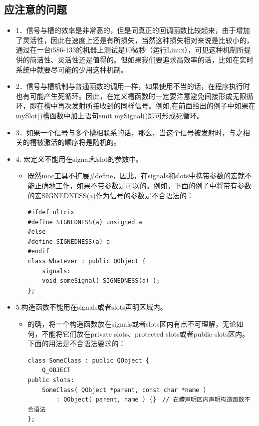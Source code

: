 \documentclass[9pt,b5paper]{article}
\begin{document}
\subsection{应注意的问题}
\label{sec-1-7}
\begin{itemize}
\item 1．信号与槽的效率是非常高的，但是同真正的回调函数比较起来，由于增加了灵活性，因此在速度上还是有所损失，当然这种损失相对来说是比较小的，通过在一台i586-133的机器上测试是10微秒（运行Linux），可见这种机制所提供的简洁性、灵活性还是值得的。但如果我们要追求高效率的话，比如在实时系统中就要尽可能的少用这种机制。
\item 2．信号与槽机制与普通函数的调用一样，如果使用不当的话，在程序执行时也有可能产生死循环。因此，在定义槽函数时一定要注意避免间接形成无限循环，即在槽中再次发射所接收到的同样信号。例如,在前面给出的例子中如果在mySlot()槽函数中加上语句emit mySignal()即可形成死循环。
\item 3．如果一个信号与多个槽相联系的话，那么，当这个信号被发射时，与之相关的槽被激活的顺序将是随机的。
\item 4. 宏定义不能用在signal和slot的参数中。
\begin{itemize}
\item 既然moc工具不扩展\#define，因此，在signals和slots中携带参数的宏就不能正确地工作，如果不带参数是可以的。例如，下面的例子中将带有参数的宏SIGNEDNESS(a)作为信号的参数是不合语法的：
\lstset{language=java,label= ,caption= ,numbers=none}
\begin{lstlisting}
#ifdef ultrix  
#define SIGNEDNESS(a) unsigned a  
#else  
#define SIGNEDNESS(a) a  
#endif  
class Whatever : public QObject {  
    signals:  
    void someSignal( SIGNEDNESS(a) );  
};
\end{lstlisting}
\end{itemize}
\item 5.构造函数不能用在signals或者slots声明区域内。
\begin{itemize}
\item 的确，将一个构造函数放在signals或者slots区内有点不可理解，无论如何，不能将它们放在private slots、protected slots或者public slots区内。下面的用法是不合语法要求的：
\lstset{language=java,label= ,caption= ,numbers=none}
\begin{lstlisting}
class SomeClass : public QObject {  
    Q_OBJECT  
public slots:  
    SomeClass( QObject *parent, const char *name )  
        : QObject( parent, name ) {}　// 在槽声明区内声明构造函数不合语法  
};
\end{lstlisting}
\end{itemize}

\end{itemize}
\end{document}
